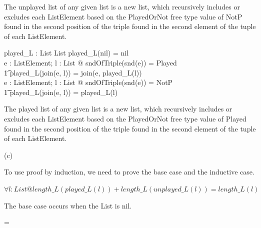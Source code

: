 \documentclass[a4paper,10pt,fleqn]{article}
\begin{document}
\noindent The unplayed list of any given list is a new list, which recursively includes or excludes each ListElement based on the PlayedOrNot free type value of NotP found in the second position of the triple found in the second element of the tuple of each ListElement. 

\bigskip

\begin{axdef}
played\_L : List \fun List
\where
played\_L(nil) = nil \\
\forall e : ListElement; l : List @ sndOfTriple(snd(e)) = Played \implies \\
\t1 played\_L(join(e, l)) = join(e, played\_L(l)) \\
\forall e : ListElement; l : List @ sndOfTriple(snd(e)) = NotP \implies \\
\t1 played\_L(join(e, l)) = played\_L(l)
\end{axdef}

\noindent The played list of any given list is a new list, which recursively includes or excludes each ListElement based on the PlayedOrNot free type value of Played found in the second position of the triple found in the second element of the tuple of each ListElement. 

\bigskip

\setlength{\leftskip}{0pt}
\medskip

\noindent\hspace*{\parindent}(c)

\setlength{\leftskip}{\dimexpr\parindent+2em\relax}
\noindent To use proof by induction, we need to prove the base case and the inductive case. 

\bigskip


\bigskip

\setlength{\leftskip}{\dimexpr\parindent+2em\relax}
\noindent
$\forall l : List @ length\_L(played\_L(l)) + length\_L(unplayed\_L(l)) = length\_L(l)$


\noindent The base case occurs when the List is nil.

\bigskip

\savedleftskip=\leftskip
\noindent
{}
\bigskip
\end{document}
